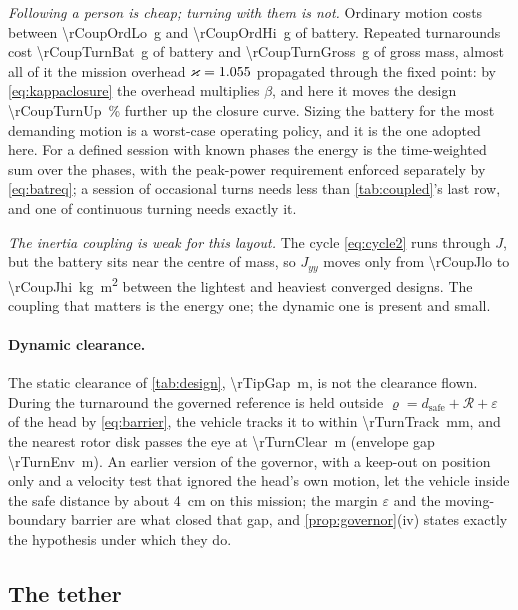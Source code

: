 \emph{Following a person is cheap; turning with them is not.} Ordinary motion
costs between \SI{\rCoupOrdLo}{\gram} and \SI{\rCoupOrdHi}{\gram} of battery.
Repeated turnarounds cost \SI{\rCoupTurnBat}{\gram} of battery and
\SI{\rCoupTurnGross}{\gram} of gross mass, almost all of it the mission
overhead $\varkappa=1.055$ propagated through the fixed point: by
\cref{eq:kappaclosure} the overhead multiplies $\beta$, and here it moves the
design \SI{\rCoupTurnUp}{\percent} further up the closure curve. Sizing the
battery for the most demanding motion is a worst-case operating policy, and
it is the one adopted here. For a defined session with known phases the
energy is the time-weighted sum over the phases, with the peak-power
requirement enforced separately by \cref{eq:batreq}; a session of occasional
turns needs less than \cref{tab:coupled}'s last row, and one of continuous
turning needs exactly it.

\emph{The inertia coupling is weak for this layout.} The cycle \cref{eq:cycle2}
runs through $J$, but the battery sits near the centre of mass, so $J_{yy}$
moves only from \num{\rCoupJlo} to \SI{\rCoupJhi}{\kilo\gram\metre\squared}
between the lightest and heaviest converged designs. The coupling that matters
is the energy one; the dynamic one is present and small.

\paragraph{Dynamic clearance.} The static clearance of \cref{tab:design},
\SI{\rTipGap}{\metre}, is not the clearance flown. During the turnaround the
governed reference is held outside $\varrho = d_{\mathrm{safe}}+\mathcal{R}+
\varepsilon$ of the head by \cref{eq:barrier}, the vehicle tracks it to within
\SI{\rTurnTrack}{\milli\metre}, and the nearest rotor disk passes the eye at
\SI{\rTurnClear}{\metre} (envelope gap \SI{\rTurnEnv}{\metre}). An earlier
version of the governor, with a keep-out on position only and a velocity test
that ignored the head's own motion, let the vehicle inside the safe distance
by about \SI{4}{\centi\metre} on this mission; the margin $\varepsilon$ and
the moving-boundary barrier are what closed that gap, and
\cref{prop:governor}(iv) states exactly the hypothesis under which they do.

\FloatBarrier
\subsection{The tether}

